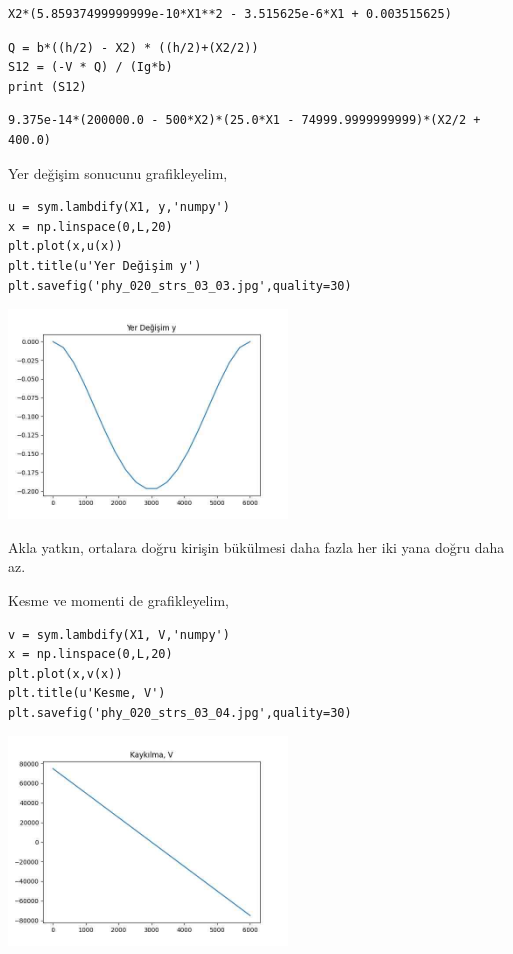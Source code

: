 \documentclass[12pt,fleqn]{article}\usepackage{../../common}
\begin{document}
\begin{verbatim}
X2*(5.85937499999999e-10*X1**2 - 3.515625e-6*X1 + 0.003515625)
\end{verbatim}

\begin{verbatim}
Q = b*((h/2) - X2) * ((h/2)+(X2/2))
S12 = (-V * Q) / (Ig*b)
print (S12)
\end{verbatim}

\begin{verbatim}
9.375e-14*(200000.0 - 500*X2)*(25.0*X1 - 74999.9999999999)*(X2/2 + 400.0)
\end{verbatim}

Yer değişim sonucunu grafikleyelim,

\begin{verbatim}
u = sym.lambdify(X1, y,'numpy')
x = np.linspace(0,L,20)
plt.plot(x,u(x))
plt.title(u'Yer Değişim y')
plt.savefig('phy_020_strs_03_03.jpg',quality=30)
\end{verbatim}

\includegraphics[width=20em]{phy_020_strs_03_03.jpg}

Akla yatkın, ortalara doğru kirişin bükülmesi daha fazla her iki yana doğru daha
az.

Kesme ve momenti de grafikleyelim,

\begin{verbatim}
v = sym.lambdify(X1, V,'numpy')
x = np.linspace(0,L,20)
plt.plot(x,v(x))
plt.title(u'Kesme, V')
plt.savefig('phy_020_strs_03_04.jpg',quality=30)
\end{verbatim}

\includegraphics[width=20em]{phy_020_strs_03_04.jpg}
\end{document}
